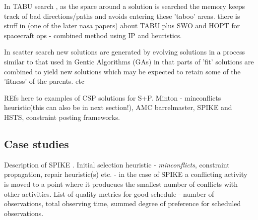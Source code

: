 \begin{description}
In TABU search \cite{glover99tabu}, as the space around a solution is searched the memory keeps track of bad directions/paths and avoids entering these 'taboo' areas. there is stuff in \cite{xxx} (one of the later nasa papers) about TABU plus SWO and HOPT for spacecraft ops - combined method using IP and heuristics.

In scatter search new \cite{xxx} solutions are generated by evolving solutions in a process similar to that used in Gentic Algorithms (GAs) in that parts of 'fit' solutions are combined to yield new solutions which may be expected to retain some of the 'fitness' of the parents. etc

\end{description}

REfs here to examples of CSP solutions for S+P. Minton - minconflicts heuristic(this can also be in next section!), AMC barrelmaster, SPIKE and HSTS, constraint posting frameworks.
 
\subsection{Case studies}

Description of SPIKE \cite{johnston94spike}. Initial selection heuristic - \emph{minconflicts}, constraint propagation, repair heuristic(s) etc.
- in the case of SPIKE a conflicting activity is moved to a point where it producues the smallest number of conflicts with other activities. List of quality metrics for good schedule - number of observations, total observing time, summed degree of preference for scheduled observations.

